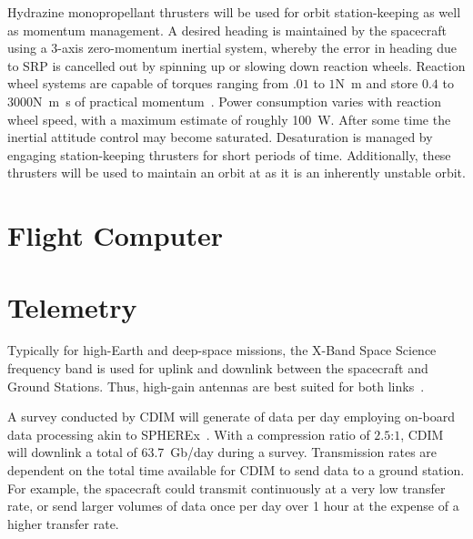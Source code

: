 \documentclass{ws-jai}
\begin{document}
Hydrazine monopropellant thrusters will be used for orbit station-keeping as well as momentum management.
A desired heading is maintained by the spacecraft using a 3-axis zero-momentum inertial system, whereby the error in heading due to SRP is cancelled out by spinning up or slowing down reaction wheels.
Reaction wheel systems are capable of torques ranging from $.01$ to $1$\si{\newton\meter} and store $0.4$ to $3000$\si{\newton\meter\second} of practical momentum~\cite{smad2015}.
Power consumption varies with reaction wheel speed, with a maximum estimate of roughly \SI{100}{\watt}.
After some time the inertial attitude control may become saturated.
Desaturation is managed by engaging station-keeping thrusters for short periods of time.
Additionally, these thrusters will be used to maintain an orbit at \Ltwo{} as it is an inherently unstable orbit.

\section{Flight Computer}

\section{Telemetry}
\label{sec:telemetry}
Typically for high-Earth and deep-space missions, the X-Band Space Science frequency band is used for uplink and downlink between the spacecraft and Ground Stations.
Thus, high-gain antennas are best suited for both links~\cite{smad2015}.

A survey conducted by CDIM will generate  of data per day employing on-board data processing akin to SPHEREx~\cite{spherexTelemetry2016}.
With a compression ratio of $2.5$:$1$, CDIM will downlink a total of \SI{63.7}{Gb/day} during a survey.
Transmission rates are dependent on the total time available for CDIM to send data to a ground station.
For example, the spacecraft could transmit continuously at a very low transfer rate, or send larger volumes of data once per day over 1 hour at the expense of a higher transfer rate.
\end{document}
